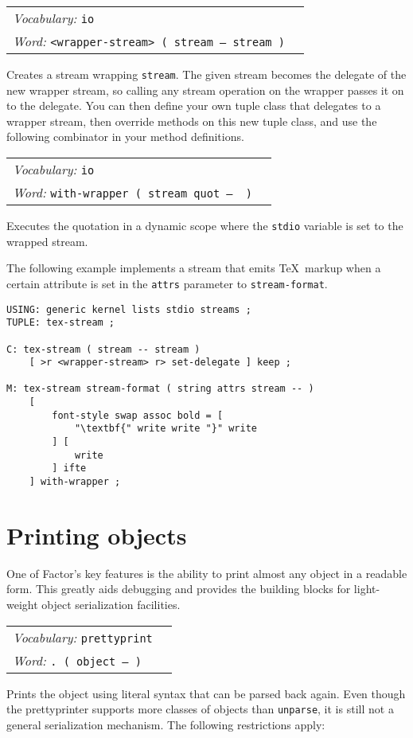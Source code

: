 \documentclass{book}
\newcommand{\vocabulary}[1]{\emph{Vocabulary:} \texttt{#1}&\\}
\newcommand{\ordinaryword}[2]{\index{\texttt{#1}}\emph{Word:} \texttt{#2}&\\}
\newcommand{\wordtable}[1]{


\begin{tabularx}{12cm}{lX}
\hline
#1
\hline
\end{tabularx}

}
\begin{document}
\wordtable{
\vocabulary{io}
\ordinaryword{<wrapper-stream>}{<wrapper-stream>~( stream -- stream~)}
}
Creates a stream wrapping \texttt{stream}. The given stream becomes the delegate of the new wrapper stream, so calling any stream operation on the wrapper passes it on to the delegate.
You can then define your own tuple class that delegates to a wrapper stream, then override methods on this new tuple class, and use the following combinator in your method definitions.

\wordtable{
\vocabulary{io}
\ordinaryword{with-wrapper}{with-wrapper~( stream quot -- ~)}
}
Executes the quotation in a dynamic scope where the \texttt{stdio} variable is set to the wrapped stream.

The following example implements a stream that emits \TeX\ markup when a certain attribute is set in the \texttt{attrs} parameter to \texttt{stream-format}.

\begin{verbatim}
USING: generic kernel lists stdio streams ;
TUPLE: tex-stream ;

C: tex-stream ( stream -- stream )
    [ >r <wrapper-stream> r> set-delegate ] keep ;

M: tex-stream stream-format ( string attrs stream -- )
    [
        font-style swap assoc bold = [
            "\textbf{" write write "}" write
        ] [
            write
        ] ifte
    ] with-wrapper ;
\end{verbatim}

\section{Printing objects}\label{prettyprint}


One of Factor's key features is the ability to print almost any object in a readable form. This greatly aids debugging and provides the building blocks for light-weight object serialization facilities.

\wordtable{
\vocabulary{prettyprint}
\ordinaryword{.}{.~( object --~)}
}
Prints the object using literal syntax that can be parsed back again. Even though the prettyprinter supports more classes of objects than \texttt{unparse}, it is still not a general serialization mechanism. The following restrictions apply:
\end{document}
